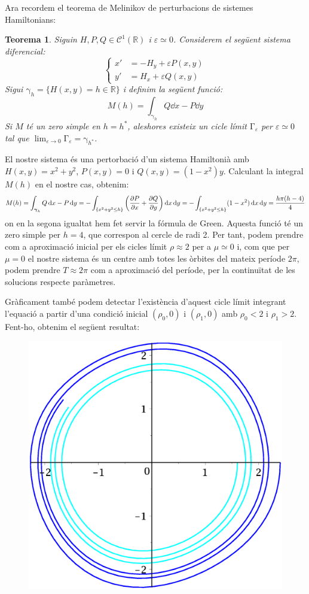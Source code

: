 \documentclass[a4paper]{article}
\newcommand{\RR}{\ensuremath{\mathbb{R}}} %
\newcommand{\vf}[1]{\boldsymbol{\mathrm{#1}}} %
\newtheorem{theorem}{Teorema}
\theoremstyle{definition}
\begin{document}
Ara recordem el teorema de Melinikov de perturbacions de sistemes Hamiltonians:
\begin{theorem}
  Siguin $H,P,Q\in\mathcal{C}^1(\RR)$ i $\varepsilon\simeq 0$. Considerem el següent sistema diferencial:
  \begin{equation*}
    \left\{
    \begin{aligned}
      x' & =-H_y +\varepsilon P(x,y) \\
      y' & =H_x +\varepsilon Q(x,y)
    \end{aligned}
    \right.
  \end{equation*}
  Sigui $\vf\gamma_h=\{H(x,y)=h\in\RR\}$ i definim la següent funció: $$M(h)=\int_{\vf\gamma_h}Q\dd{x}-P\dd{y}$$ Si $M$ té un zero simple en $h=h^*$, aleshores existeix un cicle límit $\vf\Gamma_\varepsilon$ per $\varepsilon\simeq 0$ tal que $\displaystyle\lim_{\varepsilon\to 0}\vf\Gamma_\varepsilon=\vf\gamma_{h^*}$.
\end{theorem}
El nostre sistema és una pertorbació d'un sistema Hamiltonià amb $H(x,y) = x^2+y^2$, $P(x,y)=0$ i $Q(x,y) = (1-x^2)y$. Calculant la integral $M(h)$ en el nostre cas, obtenim:
$$
  M(h) = \int_{\vf\gamma_h}Q\dd{x}-P\dd{y} = -\int_{\{x^2+y^2\leq h\}}\left(\pdv{P}{x}+\pdv{Q}{y}\right)\dd{x}\dd{y}=-\int_{\{x^2+y^2\leq h\}}(1-x^2)\dd{x}\dd{y} = \frac{h\pi(h-4)}{4}
$$
on en la segona igualtat hem fet servir la fórmula de Green. Aquesta funció té un zero simple per $h=4$, que correspon al cercle de radi 2. Per tant, podem prendre com a aproximació inicial per els cicles límit $\rho\approx 2$ per a $\mu \simeq 0$ i, com que per $\mu=0$ el nostre sistema és un centre amb totes les òrbites del mateix període $2\pi$, podem prendre $T\approx 2\pi$ com a aproximació del període, per la continuïtat de les solucions respecte paràmetres.

Gràficament també podem detectar l'existència d'aquest cicle límit integrant l'equació a partir d'una condició inicial $(\rho_0, 0)$ i $(\rho_1,0)$ amb $\rho_0<2$ i $\rho_1>2$. Fent-ho, obtenim el següent resultat:

\begin{figure}[ht]
  \centering
  \includegraphics[width=0.5\linewidth]{Images/ex1-2sol.eps}
\end{figure}
\end{document}
